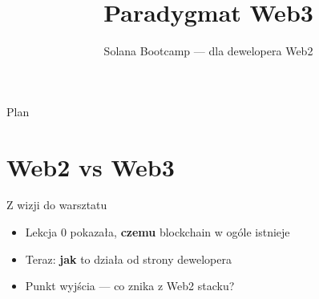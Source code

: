 

\usepackage[utf8]{inputenc}
\usepackage[T1]{fontenc}
\usetikzlibrary{positioning, arrows.meta}

\title{Paradygmat Web3}
\subtitle{Solana Bootcamp --- dla dewelopera Web2}
\author{}



\maketitleframe

\begin{frame}{Plan}
  \tableofcontents
\end{frame}

\section{Web2 vs Web3}

\begin{frame}{Z wizji do warsztatu}
  \begin{itemize}
    \item Lekcja 0 pokazała, \textbf{czemu} blockchain w ogóle istnieje
    \item Teraz: \textbf{jak} to działa od strony dewelopera
    \item Punkt wyjścia --- co znika z Web2 stacku?
  \end{itemize}
\end{frame}

